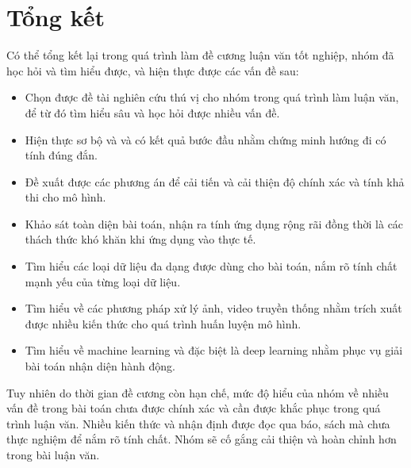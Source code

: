 \section{Tổng kết}

Có thể tổng kết lại trong quá trình làm đề cương luận văn tốt nghiệp, nhóm đã học hỏi và tìm hiểu được, và hiện thực được các vấn đề sau:

\begin{itemize}
    \item Chọn được đề tài nghiên cứu thú vị cho nhóm trong quá trình làm luận văn, để từ đó tìm hiểu sâu và học hỏi được nhiều vấn đề.
    \item Hiện thực sơ bộ và và có kết quả bước đầu nhằm chứng minh hướng đi có tính đúng đắn.
    \item Đề xuất được các phương án để cải tiến và cải thiện độ chính xác và tính khả thi cho mô hình.
    \item Khảo sát toàn diện bài toán, nhận ra tính ứng dụng rộng rãi đồng thời là các thách thức khó khăn khi ứng dụng vào thực tế.
    \item Tìm hiểu các loại dữ liệu đa dạng được dùng cho bài toán, nắm rõ tính chất mạnh yếu của từng loại dữ liệu.
    \item Tìm hiểu về các phương pháp xử lý ảnh, video truyền thống nhằm trích xuất được nhiều kiến thức cho quá trình huấn luyện mô hình.
    \item Tìm hiểu về machine learning và đặc biệt là deep learning nhằm phục vụ giải bài toán nhận diện hành động.
\end{itemize}

Tuy nhiên do thời gian đề cương còn hạn chế, mức độ hiểu của nhóm về nhiều vấn đề trong bài toán chưa được chính xác và cần được khắc phục trong quá trình luận văn. Nhiều kiến thức và nhận định được đọc qua báo, sách mà chưa thực nghiệm để nắm rõ tính chất. Nhóm sẽ cố gắng cải thiện và hoàn chỉnh hơn trong bài luận văn.